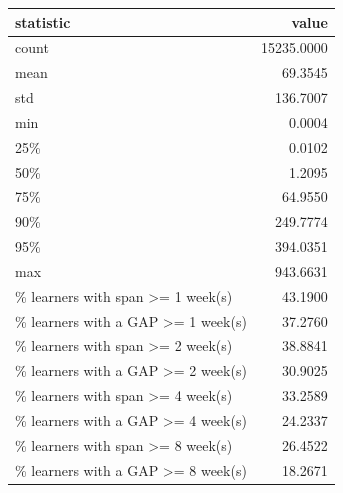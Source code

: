 \begin{tabular}{lr}
\toprule
statistic & value \\
\midrule
count & 15235.0000 \\
mean & 69.3545 \\
std & 136.7007 \\
min & 0.0004 \\
25\% & 0.0102 \\
50\% & 1.2095 \\
75\% & 64.9550 \\
90\% & 249.7774 \\
95\% & 394.0351 \\
max & 943.6631 \\
\% learners with span >= 1 week(s) & 43.1900 \\
\% learners with a GAP >= 1 week(s) & 37.2760 \\
\% learners with span >= 2 week(s) & 38.8841 \\
\% learners with a GAP >= 2 week(s) & 30.9025 \\
\% learners with span >= 4 week(s) & 33.2589 \\
\% learners with a GAP >= 4 week(s) & 24.2337 \\
\% learners with span >= 8 week(s) & 26.4522 \\
\% learners with a GAP >= 8 week(s) & 18.2671 \\
\bottomrule
\end{tabular}
